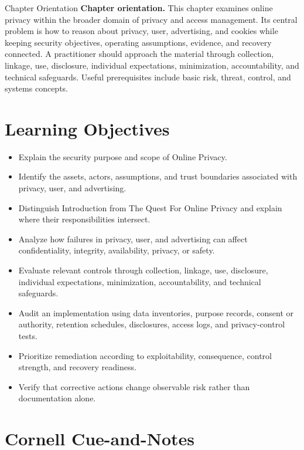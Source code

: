 \documentclass[11pt,letterpaper]{article}
\title{\CornellDocumentTitle}
\author{}
\date{}
\begin{document}
\maketitle
\begin{CornellOverviewBox}{Chapter Orientation}
\textbf{Chapter orientation.} This chapter examines online privacy within the broader domain of privacy and access management. Its central problem is how to reason about privacy, user, advertising, and cookies while keeping security objectives, operating assumptions, evidence, and recovery connected. A practitioner should approach the material through collection, linkage, use, disclosure, individual expectations, minimization, accountability, and technical safeguards. Useful prerequisites include basic risk, threat, control, and systems concepts.
\end{CornellOverviewBox}
\section*{Learning Objectives}
\begin{itemize}
\item Explain the security purpose and scope of Online Privacy.
\item Identify the assets, actors, assumptions, and trust boundaries associated with privacy, user, and advertising.
\item Distinguish Introduction from The Quest For Online Privacy and explain where their responsibilities intersect.
\item Analyze how failures in privacy, user, and advertising can affect confidentiality, integrity, availability, privacy, or safety.
\item Evaluate relevant controls through collection, linkage, use, disclosure, individual expectations, minimization, accountability, and technical safeguards.
\item Audit an implementation using data inventories, purpose records, consent or authority, retention schedules, disclosures, access logs, and privacy-control tests.
\item Prioritize remediation according to exploitability, consequence, control strength, and recovery readiness.
\item Verify that corrective actions change observable risk rather than documentation alone.
\end{itemize}
\section*{Cornell Cue-and-Notes}
\end{document}
